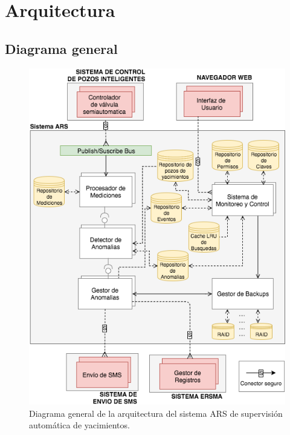 \documentclass{article}
\theoremstyle{definition}
\theoremstyle{remark}
\begin{document}
\pagebreak

\section{Arquitectura}

\subsection{Diagrama general}

\begin{figure}[H]
  \centerline{\includegraphics[scale=0.8]{figures/architecture.png}}
  \caption{Diagrama general de la arquitectura del sistema ARS de supervisión automática de yacimientos.}
\end{figure}

\pagebreak
\end{document}
